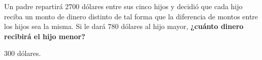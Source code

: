 \question[10] Un padre repartirá 2700 dólares entre sus cinco hijos y decidió que cada hijo reciba un monto de dinero distinto de tal forma que la diferencia de montos entre los hijos sea la misma.
Si le dará 780 dólares al hijo mayor,
\textbf{¿cuánto dinero recibirá el hijo menor?}

\begin{solutionbox}{2cm}
    300 dólares.
\end{solutionbox}